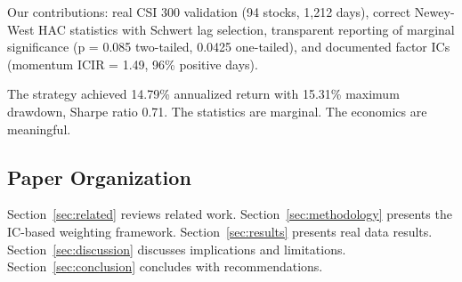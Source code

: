 Our contributions: real CSI 300 validation (94 stocks, 1,212 days), correct Newey-West HAC statistics with Schwert lag selection, transparent reporting of marginal significance (p = 0.085 two-tailed, 0.0425 one-tailed), and documented factor ICs (momentum ICIR = 1.49, 96\% positive days).

The strategy achieved 14.79\% annualized return with 15.31\% maximum drawdown, Sharpe ratio 0.71. The statistics are marginal. The economics are meaningful.

\subsection{Paper Organization}

Section~\ref{sec:related} reviews related work. Section~\ref{sec:methodology} presents the IC-based weighting framework. Section~\ref{sec:results} presents real data results. Section~\ref{sec:discussion} discusses implications and limitations. Section~\ref{sec:conclusion} concludes with recommendations.
